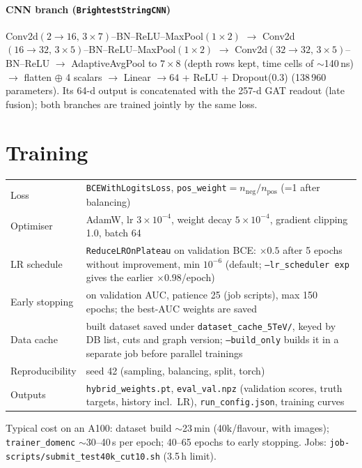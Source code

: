 \documentclass[11pt,a4paper]{article}
\newcommand{\code}[1]{\texttt{#1}}
\begin{document}
\paragraph{CNN branch (\code{BrightestStringCNN})} Conv2d$(2\to16,\,3\times7)$--BN--ReLU--MaxPool$(1\times2)$ $\to$
Conv2d$(16\to32,\,3\times5)$--BN--ReLU--MaxPool$(1\times2)$ $\to$ Conv2d$(32\to32,\,3\times5)$--BN--ReLU $\to$
AdaptiveAvgPool to $7\times8$ (depth rows kept, time cells of $\sim$140\,ns) $\to$ flatten $\oplus$ 4 scalars $\to$
Linear $\to64$ + ReLU + Dropout(0.3) (138\,960 parameters). Its 64-d output is concatenated with the 257-d GAT readout
(late fusion); both branches are trained jointly by the same loss.

\section{Training}
\begin{tabularx}{\textwidth}{lY}
\toprule
Loss & \code{BCEWithLogitsLoss}, \code{pos\_weight}$=n_\mathrm{neg}/n_\mathrm{pos}$ (=1 after balancing)\\
Optimiser & AdamW, lr $3\times10^{-4}$, weight decay $5\times10^{-4}$, gradient clipping 1.0, batch 64\\
LR schedule & \code{ReduceLROnPlateau} on validation BCE: $\times0.5$ after 5 epochs without improvement, min $10^{-6}$
               (default; \code{--lr\_scheduler exp} gives the earlier $\times0.98$/epoch)\\
Early stopping & on validation AUC, patience 25 (job scripts), max 150 epochs; the best-AUC weights are saved\\
Data cache & built dataset saved under \code{dataset\_cache\_5TeV/}, keyed by DB list, cuts and graph version;
             \code{--build\_only} builds it in a separate job before parallel trainings\\
Reproducibility & seed 42 (sampling, balancing, split, torch)\\
Outputs & \code{hybrid\_weights.pt}, \code{eval\_val.npz} (validation scores, truth targets, history incl.\ LR),
          \code{run\_config.json}, training curves\\
\bottomrule
\end{tabularx}

\medskip
Typical cost on an A100: dataset build $\sim$23\,min (40k/flavour, with images); \code{trainer\_domenc} $\sim$30--40\,s
per epoch; 40--65 epochs to early stopping. Jobs: \code{job-scripts/submit\_test40k\_cut10.sh} (3.5\,h limit).
\end{document}
